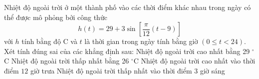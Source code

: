 \begin{ex}
	Nhiệt độ ngoài trời ở một thành phố vào các thời điểm khác nhau trong ngày có thể được mô phỏng bởi công thức
	$$
	h(t)=29+3\sin\left[\dfrac{\pi}{12}(t-9)\right]
	$$
	với $h$ tính bằng độ $\mathrm{C}$ và $t$ là thời gian trong ngày tính bằng giờ $(0 \le t <24)$. Xét tính đúng sai của các khẳng định sau:
	\choiceTF
	{Nhiệt độ ngoài trời cao nhất bằng 29 $^\circ$C}
	{\True Nhiệt độ ngoài trời thấp nhất bằng 26 $^\circ$C}
	{Nhiệt độ ngoài trời cao nhất vào thời điểm $12$ giờ trưa}
	{\True Nhiệt độ ngoài trời thấp nhất vào thời điểm $3$ giờ sáng} 
\end{ex}

